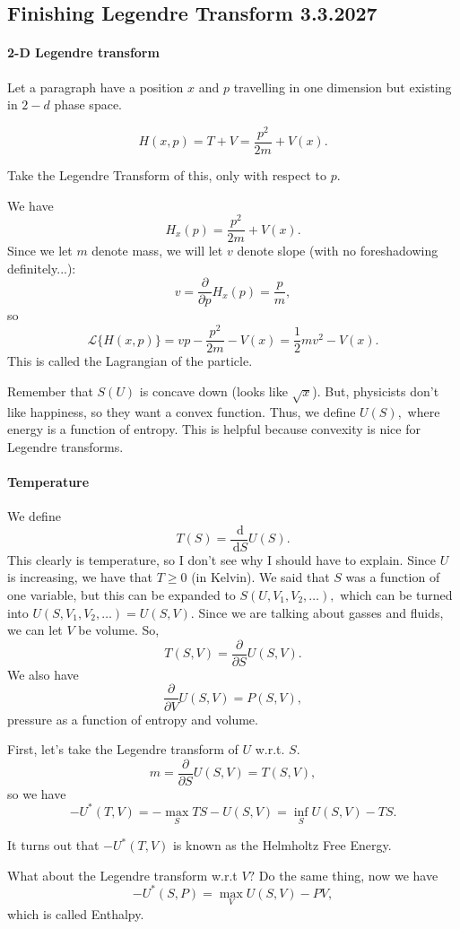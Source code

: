\documentclass[12pt]{article}
\theoremstyle{remark}
\newcommand{\diffn}[1]{\,\mathrm{d}{#1}}
\newcommand{\fdiffn}[2]{\frac{\diffn{#1}}{\diffn{#2}}}
\begin{document}
\subsection{Finishing Legendre Transform 3.3.2027}
\paragraph{2-D Legendre transform}
Let a paragraph have a position $x$ and $p$ travelling in one dimension but existing in $2-d$ phase space.

\[H(x,p)=T+V=\frac{p^2}{2m}+V(x).\]

Take the Legendre Transform of this, only with respect to $p.$

We have
\[H_{x}(p)=\frac{p^2}{2m}+V(x).\] Since we let $m$ denote mass, we will let $v$ denote slope (with no foreshadowing definitely...):
\[v=\frac{\partial}{\partial p}H_x(p)=\frac{p}{m},\] so
\[\mathcal{L}\{H(x,p)\}=vp-\frac{p^2}{2m}-V(x)=\frac{1}{2}mv^2-V(x).\]
This is called the Lagrangian of the particle.

Remember that $S(U)$ is concave down (looks like $\sqrt x$). But, physicists don't like happiness, so they want a convex function. Thus, we define $U(S),$ where energy is a function of entropy. This is helpful because convexity is nice for Legendre transforms.

\paragraph{Temperature}
We define
\[T(S)=\fdiffn{}{S}U(S).\] This clearly is temperature, so I don't see why I should have to explain. Since $U$ is increasing, we have that $T\ge 0$ (in Kelvin). We said that $S$ was a function of one variable, but this can be expanded to $S(U, V_1,V_2,\dots),$ which can be turned into $U(S,V_1,V_2,\dots)=U(S,V).$ Since we are talking about gasses and fluids, we can let $V$ be volume. So,
\[T(S,V)=\frac{\partial}{\partial S}U(S,V).\]
We also have
\[\frac{\partial}{\partial V}U(S,V)=P(S,V),\] pressure as a function of entropy and volume. 

First, let's take the Legendre transform of $U$ w.r.t. $S.$
\[m=\frac{\partial}{\partial S}U(S,V)=T(S,V),\] so we have
\[-U^\ast(T,V)=-\max_S TS-U(S,V)=\inf_S U(S,V)-TS.\]

It turns out that $-U^\ast(T,V)$ is known as the Helmholtz Free Energy.

What about the Legendre transform w.r.t $V?$
Do the same thing, now we have
\[-U^\ast(S, P)=\max_V U(S,V)-PV,\] which is called Enthalpy.
\end{document}
